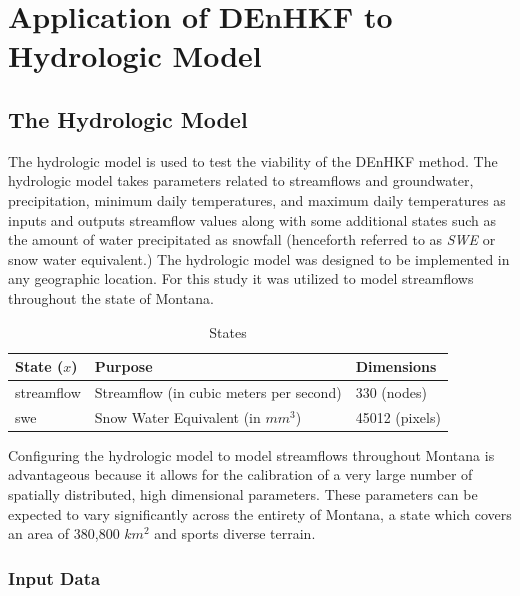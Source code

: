 \chapter{Application of DEnHKF to Hydrologic Model}

\section{The Hydrologic Model}

The hydrologic model is used to test the viability of the DEnHKF method. The hydrologic model takes parameters related to streamflows and groundwater, precipitation, minimum daily temperatures, and maximum daily temperatures as inputs and outputs streamflow values along with some additional states such as the amount of water precipitated as snowfall (henceforth referred to as \textit{SWE} or snow water equivalent.) The hydrologic model was designed to be implemented in any geographic location. For this study it was utilized to model streamflows throughout the state of Montana.

\begin{table}[]
\caption{States} 
\begin{tabular}{lll}
State ($x$) & Purpose                              & Dimensions  \\ \hline
streamflow  & Streamflow (in cubic meters per second)               & 330 (nodes) \\
swe         & Snow Water Equivalent  (in $mm^{3}$) & 45012 (pixels)
\end{tabular}
\label{tab:states}
\end{table}

Configuring the hydrologic model to model streamflows throughout Montana is advantageous because it allows for the calibration of a very large number of spatially distributed, high dimensional parameters. These parameters can be expected to vary significantly across the entirety of Montana, a state which covers an area of 380,800 $km^{2}$ and sports diverse terrain.

\subsection{Input Data}

